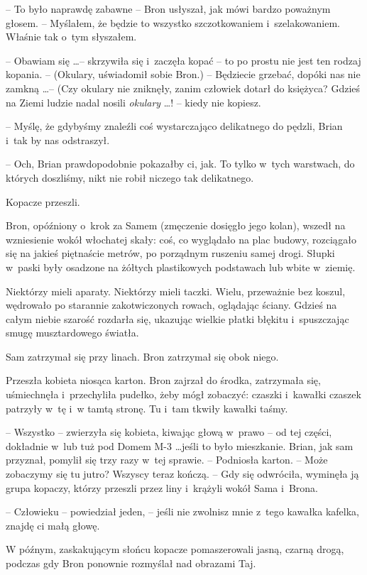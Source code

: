 \documentclass[oneside,polish,11pt,rmheadings]{mwbk}
\begin{document}
-- To było naprawdę zabawne -- Bron usłyszał, jak mówi bardzo poważnym głosem. -- Myślałem, że będzie to wszystko szczotkowaniem i~szelakowaniem. Właśnie tak o~tym słyszałem. 

-- Obawiam się \ldots  -- skrzywiła się i~zaczęła kopać -- to po prostu nie jest ten rodzaj kopania. -- (Okulary, uświadomił sobie Bron.) -- Będziecie grzebać, dopóki nas nie zamkną \ldots   -- (Czy okulary nie zniknęły, zanim człowiek dotarł do księżyca? Gdzieś na Ziemi ludzie nadal nosili \textit{okulary } \ldots  ! -- kiedy nie kopiesz. 

-- Myślę, że gdybyśmy znaleźli coś wystarczająco delikatnego do pędzli, Brian i~tak by nas odstraszył. 

-- Och, Brian prawdopodobnie pokazałby ci, jak. To tylko w~tych warstwach, do których doszliśmy, nikt nie robił niczego tak delikatnego. 

Kopacze przeszli. 

Bron, opóźniony o~krok za Samem (zmęczenie dosięgło jego kolan), wszedł na wzniesienie wokół włochatej skały: coś, co wyglądało na plac budowy, rozciągało się na jakieś piętnaście metrów, po porządnym ruszeniu samej drogi. Słupki w~paski były osadzone na żółtych plastikowych podstawach lub wbite w~ziemię. 

Niektórzy mieli aparaty. Niektórzy mieli taczki. Wielu, przeważnie bez koszul, wędrowało po starannie zakotwiczonych rowach, oglądając ściany. Gdzieś na całym niebie szarość rozdarła się, ukazując wielkie płatki błękitu i~spuszczając smugę musztardowego światła. 

Sam zatrzymał się przy linach. Bron zatrzymał się obok niego. 

Przeszła kobieta niosąca karton. Bron zajrzał do środka, zatrzymała się, uśmiechnęła i~przechyliła pudełko, żeby mógł zobaczyć: czaszki i~kawałki czaszek patrzyły w~tę i~w tamtą stronę. Tu i~tam tkwiły kawałki taśmy. 

-- Wszystko -- zwierzyła się kobieta, kiwając głową w~prawo -- od tej części, dokładnie w~lub tuż pod Domem M-3 \ldots  jeśli to było mieszkanie. Brian, jak sam przyznał, pomylił się trzy razy w~tej sprawie. -- Podniosła karton.  -- Może zobaczymy się tu jutro? Wszyscy teraz kończą. -- Gdy się odwróciła, wyminęła ją grupa kopaczy, którzy przeszli przez liny i~krążyli wokół Sama i~Brona. 

-- Człowieku -- powiedział jeden, -- jeśli nie zwolnisz mnie z~tego kawałka kafelka, znajdę ci małą głowę. 

W późnym, zaskakującym słońcu kopacze pomaszerowali jasną, czarną drogą, podczas gdy Bron ponownie rozmyślał nad obrazami Taj. 
\end{document}
